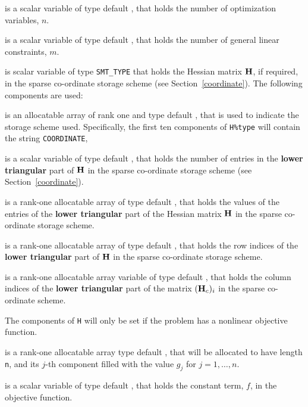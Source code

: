 \documentclass{galahad}
\begin{document}
\begin{description}

 is a scalar variable of type default \integer,
 that holds the number of optimization variables, $n$.

 is a scalar variable of type default \integer,
 that holds the number of general linear constraints, $m$.

 is scalar variable of type {\tt SMT\_TYPE}
that holds the Hessian matrix ${\mathbf{H}}$, if required,
in the sparse co-ordinate storage scheme (see Section~\ref{coordinate}).
The following components are used:

\begin{description}

 is an allocatable array of rank one and type default \character,
that is used to indicate the storage scheme used. Specifically,
the first ten components of {\tt H\%type} will contain the
string {\tt COORDINATE},

 is a scalar variable of type default \integer, that
holds the number of entries in the {\bf lower triangular} part of ${\mathbf{H}}$
in the sparse co-ordinate storage scheme (see Section~\ref{coordinate}).

 is a rank-one allocatable array of type default \realdp, that
holds the values of the entries of the {\bf lower triangular} part
of the Hessian matrix ${\mathbf{H}}$ in the sparse co-ordinate storage scheme.

 is a rank-one allocatable array of type default \integer,
that holds the row indices of the {\bf lower triangular} part of ${\mathbf{H}}$
in the sparse co-ordinate storage scheme.

 is a rank-one allocatable array variable of type default \integer,
that holds the column indices of the {\bf lower triangular} part of the
matrix $({\mathbf{H}}_c)_i$ in the sparse co-ordinate scheme.

\end{description}

The components of {\tt H} will only be set if the problem has a
nonlinear objective function.

 is a rank-one allocatable array type default \realdp, that
will be allocated to have length {\tt n}, and its $j$-th component
filled with the value $g_{j}$ for $j = 1, \ldots , n$.

 is a scalar variable of type default \realdp, that holds the
constant term, $f$, in the objective function.


\end{description}
\end{document}
